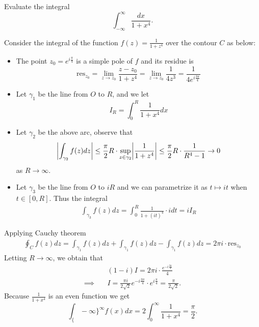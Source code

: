 \begin{problem}[Stien, Ex 2, p. 103]
  Evaluate the integral
  \[
    \int_{-\infty}^{\infty}\frac{dx}{1+x^4}.
  \]
\end{problem}
\begin{solution}
	Consider the integral of the function
  $f(z)=\frac1{1+z^4}$ over the contour $C$ as below:

  \begin{center}
  \end{center}
  \begin{itemize}
  \item 
    The point $z_0=e^{i\frac\pi 4}$ is a simple pole of $f$ and its residue is
    \[
      \text{res}_{z_0}
      =\lim_{z\to z_0}\frac{z-z_0}{1+z^4}
      =\lim_{z\to z_0}\frac{1}{4z^3}=\frac1{4e^{i\frac{3\pi}{4}}}
    \]

  \item Let $\gamma_1$ be the line from $O$ to $R$, and we let
    \[I_R=\int_{0}^{R}\frac1{1+x^4}dx\]
  \item Let $\gamma_2$ be the above arc, observe that
    \[
      \abs*{\int_{\gamma_2}f(z)dz}
      \leq \frac\pi 2R\cdot\sup_{z\in\gamma_2}\abs*{\frac1{1+z^4}}
      \leq \frac\pi 2R\cdot\frac1{R^4-1}\to 0
    \]
    as $R\to\infty$.

    
  \item Let $\gamma_3$ be the line from $O$ to $iR$ and we can parametrize
    it as $t\mapsto it$ when $t\in[0,R]$. Thus the integral
    \begin{align*}
    	\int_{\gamma_3}f(z)dz = \int_0^R \frac{1}{1+(it)^4}\cdot idt = iI_R
    \end{align*}
  \end{itemize}
  Applying Cauchy theorem
  \begin{align*}
  	\oint_C f(z)dz =
    \int_{\gamma_1}f(z)dz+
    \int_{\gamma_1}f(z)dz-
    \int_{\gamma_1}f(z)dz=2\pi i\cdot\text{res}_{z_0}
  \end{align*}
  Letting $R\to\infty$, we obtain that
  \begin{align*}
  	&(1-i)I = 2\pi i\cdot \frac{e^{-i\frac{3\pi}4}}{4}
    \\\implies\quad
    &I = \frac{\pi i}{2\sqrt 2}e^{-i\frac{3\pi}4}\cdot e^{i\frac{\pi}4}
      =\frac\pi {2\sqrt 2}.
  \end{align*}
  Because $\frac1{1+x^4}$ is an even function we get
  \[\int_\{-\infty\}^{\infty}f(x)dx=2\int_{0}^{\infty}\frac1{1+x^4}=\frac\pi 2.\]
\end{solution}

